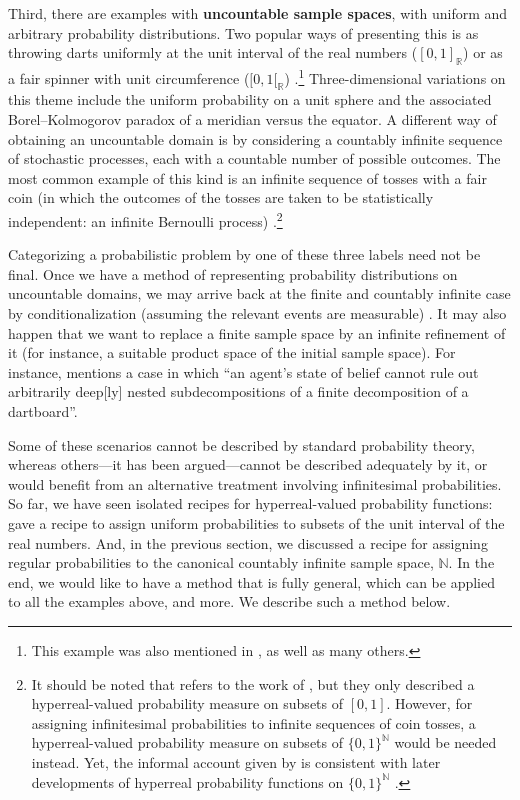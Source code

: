 Third, there are examples with \textbf{uncountable sample spaces}, with uniform and arbitrary probability distributions.
Two popular ways of presenting this is as throwing darts uniformly at the unit interval of the real numbers ($[0,1]_\mathbb{R}$) \citep[\textit{e.g.}, ][]{BernsteinWattenberg:1969} or as a fair spinner with unit circumference ($[0,1[_\mathbb{R}$) \citep[\textit{e.g.}, ][]{Skyrms:1995,Barrett:2010}.\footnote{This example was also mentioned in \citet{Lewis:1980}, as well as many others.} Three-dimensional variations on this theme include the uniform probability on a unit sphere and the associated Borel--Kolmogorov paradox of a meridian versus the equator.
A different way of obtaining an uncountable domain is by considering a countably infinite sequence of stochastic processes, each with a countable number of possible outcomes.
The most common example of this kind is an infinite sequence of tosses with a fair coin (in which the outcomes of the tosses are taken to be statistically independent: an infinite Bernoulli process) \citep[\textit{e.g.}, ][]{Skyrms:1980,Williamson:2007,Weintraub:2008}.\footnote{It should be noted that \citet{Skyrms:1980} refers to the work of \citet{BernsteinWattenberg:1969}, but they only described a hyperreal-valued probability measure on subsets of $[0,1]$. However, for assigning infinitesimal probabilities to infinite sequences of coin tosses, a hyperreal-valued probability measure on subsets of $\{0,1\}^\mathbb{N}$ would be needed instead. Yet, the informal account given by \citet[pp.~30--31]{Skyrms:1980} is consistent with later developments of hyperreal probability functions on $\{0,1\}^\mathbb{N}$ \citep[see, \textit{e.g.}, ][]{Benci_etal:2013}.}

Categorizing a probabilistic problem by one of these three labels need not be final.
Once we have a method of representing probability distributions on uncountable domains, we may arrive back at the finite and countably infinite case by conditionalization (assuming the relevant events are measurable) \citep[\textit{cf}.][]{Skyrms:1983a}.
It may also happen that we want to replace a finite sample space by an infinite refinement of it (for instance, a suitable product space of the initial sample space). For instance, \citet[p.~827]{Pedersen:2014a} mentions a case in which ``an agent's state of belief cannot rule out arbitrarily deep[ly] nested subdecompositions of a finite decomposition of a dartboard''.

Some of these scenarios cannot be described by standard probability theory, whereas others---it has been argued---cannot be described adequately by it, or would benefit from an alternative treatment involving infinitesimal probabilities.
So far, we have seen isolated recipes for hyperreal-valued probability functions: \citet{BernsteinWattenberg:1969} gave a recipe to assign uniform probabilities to subsets of the unit interval of the real numbers. And, in the previous section, we discussed a recipe for assigning regular probabilities to the canonical countably infinite sample space, $\mathbb{N}$.
In the end, we would like to have a method that is fully general, which can be applied to all the examples above, and more. We describe such a method below.

